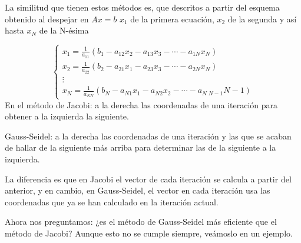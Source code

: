 La similitud que tienen estos métodos es, que descritos a partir del esquema obtenido al despejar en $Ax = b$ $x_1$ de la primera ecuación, $x_2$ de la segunda y así hasta $x_N$ de la N-ésima

\[ \left\{ \begin{array}{c}
x_1 = \frac{1}{a_{11}} (b_1 - a_{12}x_2 - a_{13}x_3 - \cdots - a_{1N}x_N) \\
x_2 = \frac{1}{a_{22}} (b_2 - a_{21}x_1 - a_{23}x_3 - \cdots - a_{2N}x_N) \\
\vdots \\
x_N = \frac{1}{a_{NN}} (b_N - a_{N1}x_1 - a_{N2}x_2 - \cdots - a_{N \; N-1}{N-1})
\end{array}
\right. \]
En el método de Jacobi: a la derecha las coordenadas de una iteración para obtener a la izquierda la siguiente.

Gauss-Seidel: a la derecha las coordenadas de una iteración y las que se acaban de hallar de la siguiente más arriba para determinar las de la siguiente a la izquierda.

La diferencia es que en Jacobi el vector de cada iteración se calcula a partir del anterior, y en cambio, en Gauss-Seidel, el vector en cada iteración usa las coordenadas que ya se han calculado en la iteración actual.

Ahora nos preguntamos: ¿es el método de Gauss-Seidel más eficiente que el método de Jacobi? Aunque esto no se cumple siempre, veámoslo en un ejemplo.

